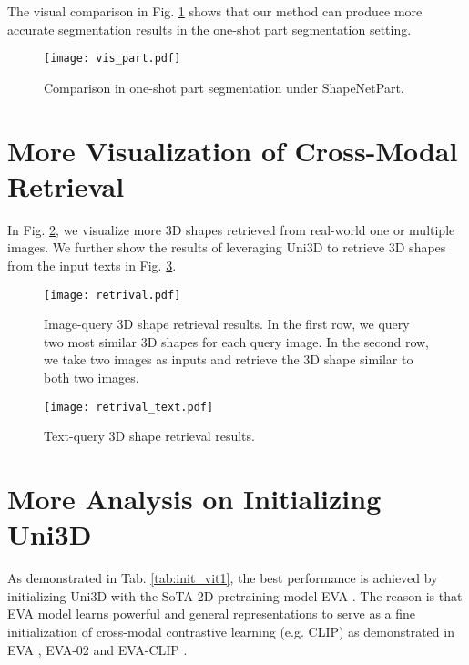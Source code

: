 \documentclass{article} \usepackage{iclr2024_conference,times}
\def\Ours{Uni3D\xspace}
\begin{document}
The visual comparison in Fig. \ref{fig:part2} shows that our method can produce more accurate segmentation results in the one-shot part segmentation setting. 

\begin{figure}[b]
    \centering
    \texttt{[image: vis\_part.pdf]}
    \caption{Comparison in one-shot part segmentation under ShapeNetPart.}
    \label{fig:part2}
\end{figure}


      






   






\section{More Visualization of Cross-Modal Retrieval}
\label{sec.appendR}

In Fig. \ref{fig:retrival_image}, we visualize more 3D shapes retrieved from real-world one or multiple images.  We further show the results of leveraging \Ours to retrieve 3D shapes from the input texts in Fig. \ref{fig:retrival_text}.


\begin{figure}[tb]
    \centering
    \texttt{[image: retrival.pdf]}
    \caption{Image-query 3D shape retrieval results. In the first row, we query two most similar 3D shapes for each query image. In the second row, we  take two images as inputs and retrieve the 3D shape similar to both two images.}
    \label{fig:retrival_image}
\end{figure}

\begin{figure}[tb]
    \centering
    \texttt{[image: retrival\_text.pdf]}
    \caption{Text-query 3D shape retrieval results.}
    \label{fig:retrival_text}
\end{figure}

\section{More Analysis on Initializing \Ours}
\label{appendix:init}


As demonstrated in Tab. \ref{tab:init_vit1}, the best performance is achieved by initializing \Ours with the SoTA 2D pretraining model EVA \citep{fang2023eva}. The reason is that EVA model learns powerful and general representations to serve as a fine initialization of cross-modal contrastive learning (e.g. CLIP) as demonstrated in EVA \citep{fang2023eva}, EVA-02 \citep{fang2023eva02} and EVA-CLIP \citep{sun2023eva}. 
\end{document}

